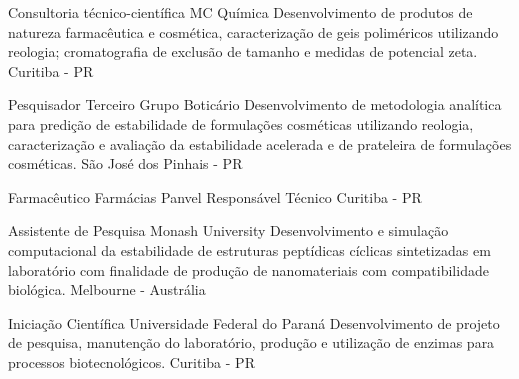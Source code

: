 

{Consultoria técnico-científica}
{MC Química}
{
    Desenvolvimento de produtos de natureza farmacêutica e cosmética, 
    caracterização de geis poliméricos utilizando reologia;
    cromatografia de exclusão de tamanho e medidas de potencial zeta.
}
{Curitiba - PR}

{Pesquisador Terceiro}
{Grupo Boticário}
{
Desenvolvimento de metodologia analítica para predição de estabilidade
de formulações cosméticas utilizando reologia,
caracterização e avaliação da estabilidade acelerada e de prateleira
de formulações cosméticas.
}
{São José dos Pinhais - PR}

{Farmacêutico}
{Farmácias Panvel}
{Responsável Técnico}
{Curitiba - PR}

{Assistente de Pesquisa}
{Monash University}
{
Desenvolvimento e simulação computacional da estabilidade 
de estruturas peptídicas cíclicas sintetizadas em laboratório 
com finalidade de produção de nanomateriais com compatibilidade biológica.
}
{Melbourne - Austrália}

{Iniciação Científica}
{Universidade Federal do Paraná}
{
Desenvolvimento de projeto de pesquisa, 
manutenção do laboratório, 
produção e utilização de enzimas para processos biotecnológicos.
}
{Curitiba - PR}
